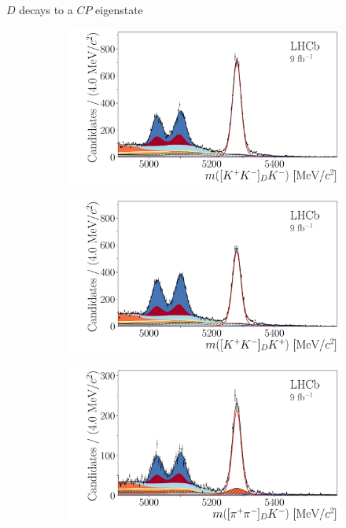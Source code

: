 \documentclass[dvipsnames]{beamer}
\begin{document}
\begin{frame}{$D$ decays to a $C\!P$ eigenstate}
  \begin{figure}
    \centering
    \begin{subfigure}{0.45\textwidth}
      \includegraphics[width = 1.0\textwidth]{Plots/B2DK_D2KK_Minus.pdf}
    \end{subfigure}%
    \begin{subfigure}{0.45\textwidth}
      \includegraphics[width = 1.0\textwidth]{Plots/B2DK_D2KK_Plus.pdf}
    \end{subfigure}
    \begin{subfigure}{0.45\textwidth}
      \includegraphics[width = 1.0\textwidth]{Plots/B2DK_D2pipi_Minus.pdf}

\end{subfigure}
\end{figure}
\end{frame}
\end{document}
